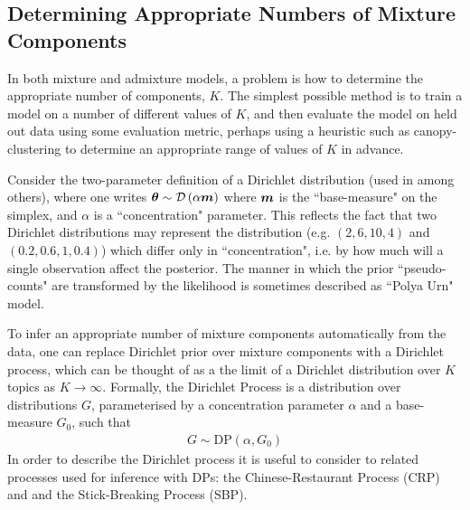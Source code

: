 

\subsection{Determining Appropriate Numbers of Mixture Components}
\label{sec:DPs}
In both mixture and admixture models, a problem is how to determine the appropriate number of components, $K$. The simplest possible method is to train a model on a number of different values of $K$, and then evaluate the model on held out data using some evaluation metric, perhaps using a heuristic such as canopy-clustering\cite{McCallum2000} to determine an appropriate range of values of $K$ in advance.


Consider the two-parameter definition of a Dirichlet distribution (used in \cite{MacKay1995}\cite{Wallach2006}\cite{Wallach2009a} among others), where one writes $\bm \theta \sim \mathcal{D} \left( {\alpha \bm m} \right)$ where $\bm m$ is the ``base-measure" on the simplex, and $\alpha$ is a ``concentration" parameter. This reflects the fact that two Dirichlet distributions may represent the distribution (e.g. $(2, 6, 10, 4)$ and $(0.2, 0.6, 1, 0.4)$) which differ only in ``concentration", i.e. by how much will a single observation affect the posterior. The manner in which the prior ``pseudo-counts" are transformed by the likelihood is sometimes described as ``Polya Urn" model.


To infer an appropriate number of mixture components automatically from the data, one can replace Dirichlet prior over mixture components with a Dirichlet process, which can be thought of as a the limit of a Dirichlet distribution over $K$ topics as $K \rightarrow \infty$. Formally, the Dirichlet Process is a distribution over distributions $G$, parameterised by a concentration parameter $\alpha$ and a base-measure $G_0$, such that
\begin{align*}
G \sim \text{DP}\left(\alpha, G_0\right)
\end{align*}
In order to describe the Dirichlet process it is useful to consider to related processes used for inference with DPs: the Chinese-Restaurant Process (CRP) and and the Stick-Breaking Process (SBP).

